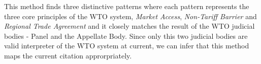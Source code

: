 This method finds three distinctive patterns where each pattern represents the three core principles of the WTO system, \textit{Market Access}, \textit{Non-Tariff Barrier} and \textit{Regional Trade Agreement} and it closely matches the result of the WTO judicial bodies - Panel and the Appellate Body.
Since only this two judicial bodies are valid interpreter of the WTO system at current, we can infer that this method maps the current citation approrpriately.


